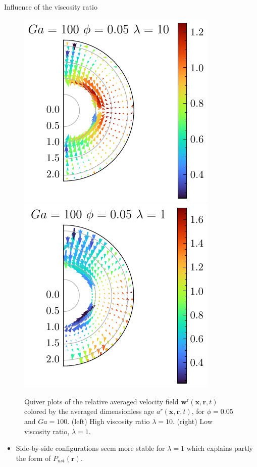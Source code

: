\documentclass{sintefbeamer}
\begin{document}
\begin{frame}
  {Influence of the viscosity ratio}

  \begin{figure}[h!]
      \centering
      \includegraphics[height=0.35\textwidth]{image/HOMOGENEOUS_NEW/Dist/U_rel_l_10_Ga_100_PHI_5.pdf}
      \includegraphics[height=0.35\textwidth]{image/HOMOGENEOUS_NEW/Dist/U_rel_l_1_Ga_100_PHI_5.pdf}
      \caption{Quiver plots of the relative averaged velocity field $\textbf{w}^\text{r}(\textbf{x},\textbf{r},t)$ colored by the averaged dimensionless age $a^r(\textbf{x},\textbf{r},t)$, for $\phi = 0.05$ and $Ga = 100$.
        \break
      (left) High viscosity ratio $\lambda = 10$.
      (right) Low viscosity ratio, $\lambda = 1$. }
      \label{fig:Why_l_matter}
  \end{figure}

  \begin{itemize}
    \item Side-by-side configurations seem more stable for $\lambda = 1$ which explains partly the form of $P_{nst}(\textbf{r})$. 
  \end{itemize}
\end{frame}
\end{document}
